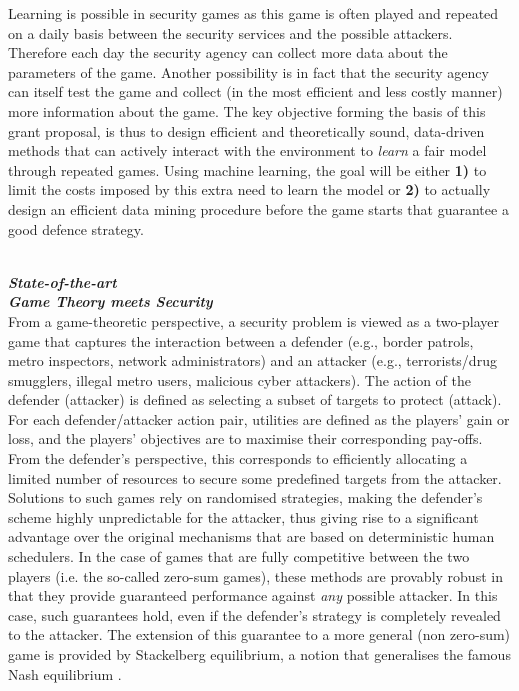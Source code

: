 Learning is possible in security games as this game is often played and repeated on a daily basis between the security services and the possible attackers. Therefore each day the security agency can collect more data about the parameters of the game. Another possibility is in fact that the security agency can itself test the game and collect (in the most efficient and less costly manner) more information about the game. The key objective forming the basis of this grant proposal, is thus to design efficient and theoretically sound, data-driven methods that can actively interact with the environment to {\em learn} a fair model through repeated games. Using machine learning, the goal will be either \textbf{1)} to limit the costs imposed by this extra need to learn the model or  \textbf{2)} to actually design an efficient data mining procedure before the game starts that guarantee a good defence strategy.




\noindent \textbf{\textit{\\State-of-the-art}}
\noindent \textbf{\textit{\\Game Theory meets Security}}\\
From a game-theoretic perspective, a security problem is viewed as a two-player game that captures the interaction between a defender (e.g., border patrols, metro inspectors, network administrators) and an attacker (e.g., terrorists/drug smugglers, illegal metro users, malicious cyber attackers). The action of the defender (attacker) is defined as selecting a subset of targets to protect (attack). For each defender/attacker action pair, utilities are defined as the players' gain or loss, and the players' objectives are to maximise their corresponding pay-offs. From the defender's perspective, this corresponds to efficiently allocating a limited number of resources to secure some predefined targets from the attacker. 
Solutions to such games rely on randomised strategies, making the defender's scheme highly unpredictable for the attacker, thus giving rise to a significant advantage over the original mechanisms that are based on deterministic human schedulers. In the case of games that are fully competitive between the two players  (i.e. the so-called zero-sum games), these methods are provably robust in that they provide guaranteed performance against {\em any} possible attacker. In this case, such guarantees hold, even if the defender's strategy is completely revealed to the attacker.  
The extension of this guarantee to a more general (non zero-sum) game is provided by Stackelberg equilibrium, a notion that generalises the famous Nash equilibrium \cite{korzhyk2011stackelberg}. 

